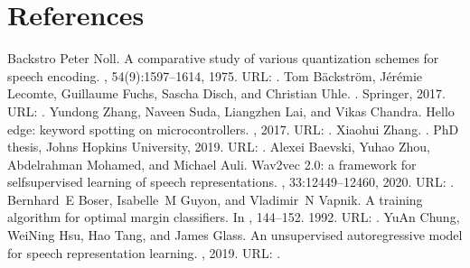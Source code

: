 \documentclass[letterpaper,10pt,english]{jupyterBook}
\begin{document}
\sphinxstepscope


\chapter{References}
\label{\detokenize{References:references}}\label{\detokenize{References::doc}}
\begin{sphinxthebibliography}{Backstro}
\sphinxAtStartPar
Peter Noll. A comparative study of various quantization schemes for speech encoding. , 54(9):1597–1614, 1975. URL: .
\sphinxAtStartPar
Tom Bäckström, Jérémie Lecomte, Guillaume Fuchs, Sascha Disch, and Christian Uhle. . Springer, 2017. URL: .
\sphinxAtStartPar
Yundong Zhang, Naveen Suda, Liangzhen Lai, and Vikas Chandra. Hello edge: keyword spotting on microcontrollers. , 2017. URL: .
\sphinxAtStartPar
Xiaohui Zhang. . PhD thesis, Johns Hopkins University, 2019. URL: .
\sphinxAtStartPar
Alexei Baevski, Yuhao Zhou, Abdelrahman Mohamed, and Michael Auli. Wav2vec 2.0: a framework for self\sphinxhyphen{}supervised learning of speech representations. , 33:12449–12460, 2020. URL: .
\sphinxAtStartPar
Bernhard E Boser, Isabelle M Guyon, and Vladimir N Vapnik. A training algorithm for optimal margin classifiers. In , 144–152. 1992. URL: .
\sphinxAtStartPar
Yu\sphinxhyphen{}An Chung, Wei\sphinxhyphen{}Ning Hsu, Hao Tang, and James Glass. An unsupervised autoregressive model for speech representation learning. , 2019. URL: .

\end{sphinxthebibliography}
\end{document}
